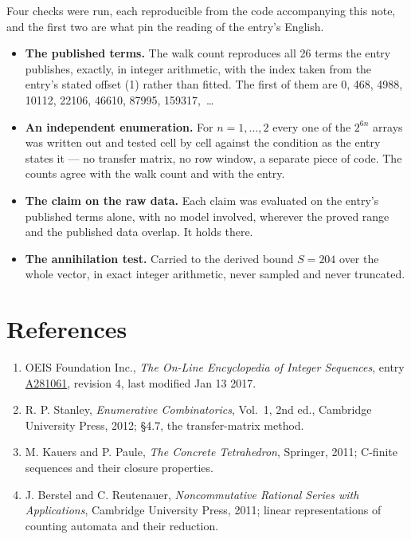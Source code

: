 \documentclass[11pt]{article}
\theoremstyle{definition}
\begin{document}
Four checks were run, each reproducible from the code accompanying this note, and the first two are what pin the reading of the entry's English.

\begin{itemize}

\item {\bfseries The published terms.} The walk count reproduces all 26 terms the entry publishes, exactly, in integer arithmetic, with the index taken from the entry's stated offset (1) rather than fitted. The first of them are 0, 468, 4988, 10112, 22106, 46610, 87995, 159317,~\dots

\item {\bfseries An independent enumeration.} For $n = 1,\dots,2$ every one of the $2^{6n}$ arrays was written out and tested cell by cell against the condition as the entry states it --- no transfer matrix, no row window, a separate piece of code. The counts agree with the walk count and with the entry.

\item {\bfseries The claim on the raw data.} Each claim was evaluated on the entry's published terms alone, with no model involved, wherever the proved range and the published data overlap. It holds there.

\item {\bfseries The annihilation test.} Carried to the derived bound $S = 204$ over the whole vector, in exact integer arithmetic, never sampled and never truncated.

\end{itemize}

\section{References}

\begin{enumerate}

\item OEIS Foundation Inc., \emph{The On-Line Encyclopedia of Integer Sequences}, entry \href{https://oeis.org/A281061}{A281061}, revision 4, last modified Jan 13 2017.

\item R. P. Stanley, \emph{Enumerative Combinatorics}, Vol.~1, 2nd ed., Cambridge University Press, 2012; \S4.7, the transfer-matrix method.

\item M. Kauers and P. Paule, \emph{The Concrete Tetrahedron}, Springer, 2011; C-finite sequences and their closure properties.

\item J. Berstel and C. Reutenauer, \emph{Noncommutative Rational Series with Applications}, Cambridge University Press, 2011; linear representations of counting automata and their reduction.

\end{enumerate}
\end{document}
